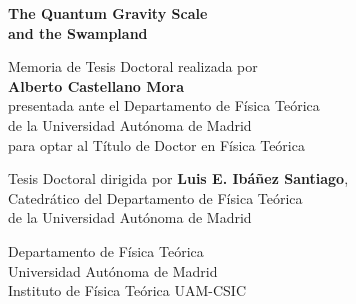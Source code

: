 
\noindent
\HRule
\begin{center}
\huge{\textbf{  The Quantum Gravity Scale\\
and the Swampland}}
 \vspace{0.2cm}
\end{center}
\HRule

\vspace{1.0cm}

\begin{center}

\large{	   
Memoria de Tesis Doctoral realizada por \\[3mm]
\textbf{\large{Alberto Castellano Mora}} \\[3mm]
presentada ante el Departamento de F\'isica Te\'orica \\[1mm]                  
de la Universidad Aut\'onoma de Madrid \\[1mm]
para optar al T\'itulo de Doctor en F\'isica Te\'orica \\[1mm]
}

\vspace{1.3cm}
Tesis Doctoral dirigida por \textbf{\large{Luis E. Ib\'a\~nez Santiago}}, \\[2mm]
Catedr\'atico del Departamento de F\'isica Te\'orica\\[1mm] de la Universidad Aut\'onoma de Madrid \\


\end{center}

\vspace{0.7cm}

\begin{center}
{\Large {Departamento de F\'isica Te\'orica\\[1mm] Universidad Aut\'onoma de Madrid }}\\
\vspace{0.5cm}
{\Large {Instituto de F\'isica Te\'orica UAM-CSIC}}\\
\end{center}
\vspace{1.2cm}


